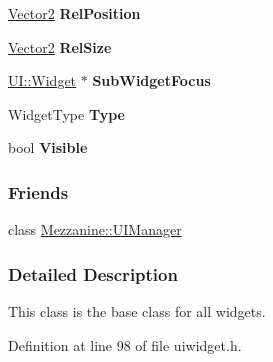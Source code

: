 \begin{DoxyCompactItemize}
\item 
\hypertarget{classMezzanine_1_1UI_1_1Widget_a900aff3bdaae26330d3d1573069ed041}{
\hyperlink{classMezzanine_1_1Vector2}{Vector2} {\bfseries RelPosition}}
\label{classMezzanine_1_1UI_1_1Widget_a900aff3bdaae26330d3d1573069ed041}

\item 
\hypertarget{classMezzanine_1_1UI_1_1Widget_ae65ab631aefe321b7635ae458c58c042}{
\hyperlink{classMezzanine_1_1Vector2}{Vector2} {\bfseries RelSize}}
\label{classMezzanine_1_1UI_1_1Widget_ae65ab631aefe321b7635ae458c58c042}

\item 
\hypertarget{classMezzanine_1_1UI_1_1Widget_aaab9e870c56a498ae0b74b66b85f1c84}{
\hyperlink{classMezzanine_1_1UI_1_1Widget}{UI::Widget} $\ast$ {\bfseries SubWidgetFocus}}
\label{classMezzanine_1_1UI_1_1Widget_aaab9e870c56a498ae0b74b66b85f1c84}

\item 
\hypertarget{classMezzanine_1_1UI_1_1Widget_a9a8e9cc0328a0e2f6849ed56920f6d07}{
WidgetType {\bfseries Type}}
\label{classMezzanine_1_1UI_1_1Widget_a9a8e9cc0328a0e2f6849ed56920f6d07}

\item 
\hypertarget{classMezzanine_1_1UI_1_1Widget_a56ab9a181ed87ea151e9be04752494da}{
bool {\bfseries Visible}}
\label{classMezzanine_1_1UI_1_1Widget_a56ab9a181ed87ea151e9be04752494da}

\end{DoxyCompactItemize}
\subsubsection*{Friends}
\begin{DoxyCompactItemize}
\item 
\hypertarget{classMezzanine_1_1UI_1_1Widget_ae6711b8bde3fabca2b5e61f955d3d13f}{
class \hyperlink{classMezzanine_1_1UI_1_1Widget_ae6711b8bde3fabca2b5e61f955d3d13f}{Mezzanine::UIManager}}
\label{classMezzanine_1_1UI_1_1Widget_ae6711b8bde3fabca2b5e61f955d3d13f}

\end{DoxyCompactItemize}


\subsubsection{Detailed Description}
This class is the base class for all widgets. 

Definition at line 98 of file uiwidget.h.



